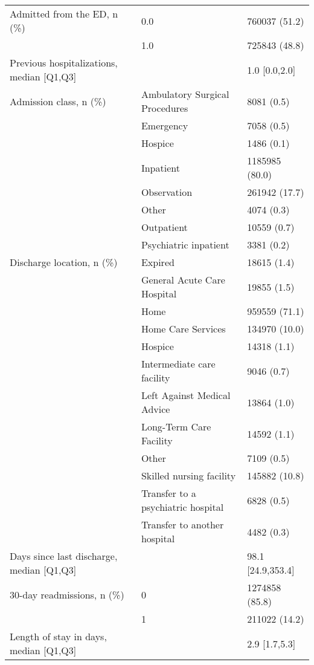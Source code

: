 \begin{tabular}{lll}
Admitted from the ED, n (\%) & 0.0 &      760037 (51.2) \\
                                       & 1.0 &      725843 (48.8) \\
Previous hospitalizations, median [Q1,Q3] &   &      1.0 [0.0,2.0] \\
Admission class, n (\%) & Ambulatory Surgical Procedures &         8081 (0.5) \\
                                       & Emergency &         7058 (0.5) \\
                                       & Hospice &         1486 (0.1) \\
                                       & Inpatient &     1185985 (80.0) \\
                                       & Observation &      261942 (17.7) \\
                                       & Other &         4074 (0.3) \\
                                       & Outpatient &        10559 (0.7) \\
                                       & Psychiatric inpatient &         3381 (0.2) \\
Discharge location, n (\%) & Expired &        18615 (1.4) \\
                                       & General Acute Care Hospital &        19855 (1.5) \\
                                       & Home &      959559 (71.1) \\
                                       & Home Care Services &      134970 (10.0) \\
                                       & Hospice &        14318 (1.1) \\
                                       & Intermediate care facility &         9046 (0.7) \\
                                       & Left Against Medical Advice &        13864 (1.0) \\
                                       & Long-Term Care Facility &        14592 (1.1) \\
                                       & Other &         7109 (0.5) \\
                                       & Skilled nursing facility &      145882 (10.8) \\
                                       & Transfer to a psychiatric hospital &         6828 (0.5) \\
                                       & Transfer to another hospital &         4482 (0.3) \\
Days since last discharge, median [Q1,Q3] &   &  98.1 [24.9,353.4] \\
30-day readmissions, n (\%) & 0 &     1274858 (85.8) \\
                                       & 1 &      211022 (14.2) \\
Length of stay in days, median [Q1,Q3] &   &      2.9 [1.7,5.3] \\
\bottomrule
\end{tabular}
